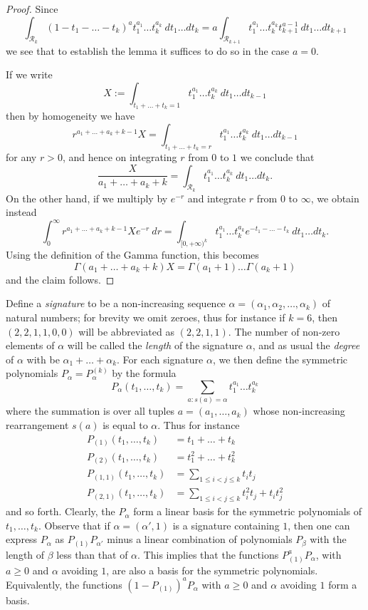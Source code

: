 \begin{proof}
Since
$$ \int_{{\mathcal R}_k} (1-t_1-\dots-t_k)^a t_1^{a_1} \dots t_k^{a_k}\ dt_1 \dots dt_k = a \int_{{\mathcal R}_{k+1}} t_1^{a_1} \dots t_k^{a_k} t_{k+1}^{a-1}\ dt_1 \dots dt_{k+1}$$
we see that to establish the lemma it suffices to do so in the case $a=0$.

If we write
$$ X := \int_{t_1+\dots+t_k=1} t_1^{a_1} \dots t_k^{a_k}\ dt_1 \dots dt_{k-1}$$
then by homogeneity we have
$$ r^{a_1+\dots+a_k+k-1} X = \int_{t_1+\dots+t_k=r} t_1^{a_1} \dots t_k^{a_k}\ dt_1 \dots dt_{k-1}$$
for any $r > 0$, and hence on integrating $r$ from $0$ to $1$ we conclude that
$$ \frac{X}{a_1+\dots+a_k+k} = \int_{{\mathcal R}_k} t_1^{a_1} \dots t_k^{a_k}\ dt_1 \dots dt_k.$$
On the other hand, if we multiply by $e^{-r}$ and integrate $r$ from $0$ to $\infty$, we obtain instead
$$ \int_0^\infty r^{a_1+\dots+a_k+k-1} X e^{-r}\ dr = \int_{[0,+\infty)^k} t_1^{a_1} \dots t_k^{a_k} e^{-t_1-\dots-t_k}\ dt_1 \dots dt_k.$$
Using the definition of the Gamma function, this becomes
$$ \Gamma(a_1+\dots+a_k+k) X = \Gamma(a_1+1) \dots \Gamma(a_k+1)$$
and the claim follows.
\end{proof}

Define a \emph{signature} to be a non-increasing sequence $\alpha = (\alpha_1,\alpha_2,\dots,\alpha_k)$ of natural numbers; for brevity we omit zeroes, thus for instance if $k=6$, then $(2,2,1,1,0,0)$ will be abbreviated as $(2,2,1,1)$.  The number of non-zero elements of $\alpha$ will be called the \emph{length} of the signature $\alpha$, and as usual the \emph{degree} of $\alpha$ with be $\alpha_1+\dots+\alpha_k$.  For each signature $\alpha$, we then define the symmetric polynomials $P_\alpha = P^{(k)}_\alpha$ by the formula
$$
P_\alpha(t_1,\dots,t_k) = \sum_{a: s(a)=\alpha} t_1^{a_1} \dots t_k^{a_k}$$
where the summation is over all tuples $a = (a_1,\dots,a_k)$ whose non-increasing rearrangement $s(a)$ is equal to $\alpha$.  Thus for instance
\begin{align*}
P_{(1)}(t_1,\dots,t_k) &= t_1 + \dots + t_k \\
P_{(2)}(t_1,\dots,t_k) &= t_1^2 + \dots + t_k^2 \\
P_{(1,1)}(t_1,\dots,t_k) &= \sum_{1 \leq i < j \leq k} t_i t_j \\
P_{(2,1)}(t_1,\dots,t_k) &= \sum_{1 \leq i < j \leq k} t_i^2 t_j + t_i t_j^2
\end{align*}
and so forth.  Clearly, the $P_\alpha$ form a linear basis for the symmetric polynomials of $t_1,\dots,t_k$.  Observe that if $\alpha = (\alpha',1)$ is a signature containing $1$, then one can express $P_\alpha$ as $P_{(1)} P_{\alpha'}$ minus a linear combination of polynomials $P_\beta$ with the length of $\beta$ less than that of $\alpha$.  This implies that the functions $P_{(1)}^a P_\alpha$, with $a \geq 0$ and $\alpha$ avoiding $1$, are also a basis for the symmetric polynomials.  Equivalently, the functions $(1-P_{(1)})^a P_\alpha$ with $a \geq 0$ and $\alpha$ avoiding $1$ form a basis.


